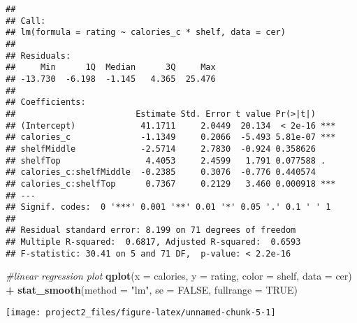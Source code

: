 \documentclass[]{article}
\newenvironment{Shaded}{\begin{snugshade}}{\end{snugshade}}
\newcommand{\CommentTok}[1]{\textcolor[rgb]{0.56,0.35,0.01}{\textit{#1}}}
\newcommand{\DataTypeTok}[1]{\textcolor[rgb]{0.13,0.29,0.53}{#1}}
\newcommand{\DecValTok}[1]{\textcolor[rgb]{0.00,0.00,0.81}{#1}}
\newcommand{\KeywordTok}[1]{\textcolor[rgb]{0.13,0.29,0.53}{\textbf{#1}}}
\newcommand{\NormalTok}[1]{#1}
\newcommand{\OperatorTok}[1]{\textcolor[rgb]{0.81,0.36,0.00}{\textbf{#1}}}
\newcommand{\OtherTok}[1]{\textcolor[rgb]{0.56,0.35,0.01}{#1}}
\newcommand{\StringTok}[1]{\textcolor[rgb]{0.31,0.60,0.02}{#1}}
\begin{document}
\begin{verbatim}
## 
## Call:
## lm(formula = rating ~ calories_c * shelf, data = cer)
## 
## Residuals:
##     Min      1Q  Median      3Q     Max 
## -13.730  -6.198  -1.145   4.365  25.476 
## 
## Coefficients:
##                        Estimate Std. Error t value Pr(>|t|)    
## (Intercept)             41.1711     2.0449  20.134  < 2e-16 ***
## calories_c              -1.1349     0.2066  -5.493 5.81e-07 ***
## shelfMiddle             -2.5714     2.7830  -0.924 0.358626    
## shelfTop                 4.4053     2.4599   1.791 0.077588 .  
## calories_c:shelfMiddle  -0.2385     0.3076  -0.776 0.440574    
## calories_c:shelfTop      0.7367     0.2129   3.460 0.000918 ***
## ---
## Signif. codes:  0 '***' 0.001 '**' 0.01 '*' 0.05 '.' 0.1 ' ' 1
## 
## Residual standard error: 8.199 on 71 degrees of freedom
## Multiple R-squared:  0.6817, Adjusted R-squared:  0.6593 
## F-statistic: 30.41 on 5 and 71 DF,  p-value: < 2.2e-16
\end{verbatim}

\begin{Shaded}
\begin{Highlighting}[]
\CommentTok{#linear regression plot}
\KeywordTok{qplot}\NormalTok{(}\DataTypeTok{x =}\NormalTok{ calories, }\DataTypeTok{y =}\NormalTok{ rating, }\DataTypeTok{color =}\NormalTok{ shelf, }\DataTypeTok{data =}\NormalTok{ cer) }\OperatorTok{+}
\KeywordTok{stat_smooth}\NormalTok{(}\DataTypeTok{method =} \StringTok{"lm"}\NormalTok{, }\DataTypeTok{se =} \OtherTok{FALSE}\NormalTok{, }\DataTypeTok{fullrange =} \OtherTok{TRUE}\NormalTok{)}
\end{Highlighting}
\end{Shaded}

\begin{center}\texttt{[image: project2\_files/figure-latex/unnamed-chunk-5-1]} \end{center}

\begin{Shaded}
\end{Shaded}
\end{document}
